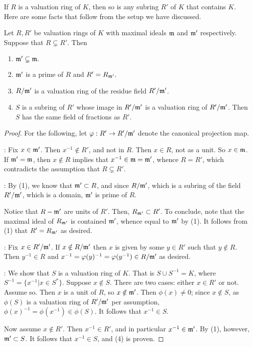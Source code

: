 If $R$ is a valuation ring of $K$, then so is any subring $R'$ of 
$K$ that contains $K$. Here are some facts that follow from the 
setup we have discussed.

\begin{prop}\label{thm_mats_10_1}
Let $R, R'$ be valuation rings of $K$ with maximal ideals 
$\mathfrak{m}$ and $\mathfrak{m'}$ respectively. Suppose that $R 
\subsetneq R'$. Then

\begin{enumerate}
\item $\mathfrak{m'} \subsetneq \mathfrak{m}.$

\item $\mathfrak{m'}$ is a prime of $R$ and $R' = R_{\mathfrak{m'}}.$

\item $R/\mathfrak{m'}$ is a valuation ring of the residue field 
$R'/\mathfrak{m'}$.

\item $S$ is a subring of $R'$ whose image in $R'/\mathfrak{m'}$ is 
a valuation ring of $R'/\mathfrak{m'}$. Then $S$ has the same field
of fractions as $R'$.
\end{enumerate}
\end{prop}
\begin{proof}
For the following, let $\varphi: R' \to R'/\mathfrak{m'}$ denote the
canonical projection map.

: Fix $x \in \mathfrak{m'}$. Then $x^{-1} \notin R'$,
and not in $R$. Then $x \in R$, not as a unit. So $x \in 
\mathfrak{m}$. If $\mathfrak{m'} = \mathfrak{m}$, then $x \notin R$ implies
that $x^{-1} \in \mathfrak{m} = \mathfrak{m'}$, whence $R = R'$, which
contradicts the assumption that $R \subsetneq R'$.

: By (1), we know that $\mathfrak{m'} \subset R$, and
since $R/\mathfrak{m'}$, which is a subring of the field 
$R'/\mathfrak{m'}$, which is a domain, $\mathfrak{m'}$ is prime of $R$.

Notice that $R - \mathfrak{m'}$ are units of $R'$. Then, 
$R_{\mathfrak{m'}} \subset R'$. To conclude, note that the maximal 
ideal of $R_{\mathfrak{m'}}$ is contained $\mathfrak{m'}$, whence equal 
to $\mathfrak{m'}$ by (1). It follows from (1) that $R' = 
R_{\mathfrak{m'}}$ as desired.

: Fix $x \in R'/\mathfrak{m'}$. If $x \notin 
R/\mathfrak{m'}$ then $x$ is given by some $y \in R'$ such that $y 
\notin R$. Then $y^{-1} \in R$ and $x^{-1} = \varphi(y)^{-1} = 
\varphi(y^{-1}) \in R/\mathfrak{m'}$ as desired.

: We show that $S$ is a valuation ring of $K$. That
is $S \cup S^{-1} = K$, where $S^{-1} = \{x^{-1} | x \in S^*\}$. 
Suppose $x \notin S$. There are two cases: either $x \in R'$ or 
not. Assume so. Then $x$ is a unit of $R$, so $x \notin 
\mathfrak{m'}$. Then $\phi(x) \neq 0$; since $x \notin S$, as 
$\phi(S)$ is a valuation ring of $R'/\mathfrak{m'}$ per assumption, 
$\phi(x)^{-1} = \phi(x^{-1}) \in \phi(S)$. It follows that 
$x^{-1} \in S$.

Now assume $x \notin R'$. Then $x^{-1} \in R'$, and in particular
$x^{-1} \in \mathfrak{m'}$. By (1), however, $\mathfrak{m'} \subset S$.
It follows that $x^{-1} \in S$, and (4) is proven.
\end{proof}

